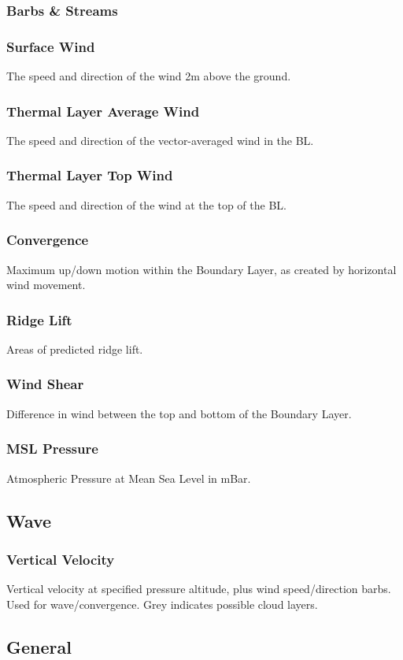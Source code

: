 \documentclass[11pt,a4paper]{article}
\begin{document}
\subsubsection{Barbs \& Streams}
\subsubsection{Surface Wind}
The speed and direction of the wind 2m above the ground.
\subsubsection{Thermal Layer Average Wind}
The speed and direction of the vector-averaged wind in the BL.
\subsubsection{Thermal Layer Top Wind}
The speed and direction of the wind at the top of the BL.
\subsubsection{Convergence}
Maximum up/down motion within the Boundary Layer, as created by horizontal wind movement.
\subsubsection{Ridge Lift}
Areas of predicted ridge lift.
\subsubsection{Wind Shear}
Difference in wind between the top and bottom of the Boundary Layer.
\subsubsection{MSL Pressure}
Atmospheric Pressure at Mean Sea Level in mBar.
\subsection{Wave}
\subsubsection{Vertical Velocity}
Vertical velocity at specified pressure altitude, plus wind speed/direction barbs. Used for wave/convergence. Grey indicates possible cloud layers.

\subsection{General}
\end{document}
